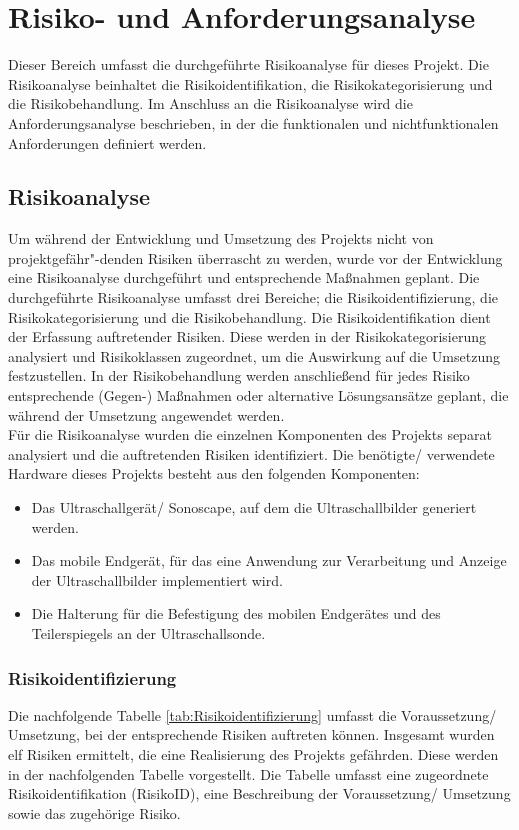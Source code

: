 \chapter{Risiko- und Anforderungsanalyse}
Dieser Bereich umfasst die durchgeführte Risikoanalyse für dieses Projekt. Die Risikoanalyse beinhaltet die Risikoidentifikation, die Risikokategorisierung und die Risikobehandlung. Im Anschluss an die Risikoanalyse wird die Anforderungsanalyse beschrieben, in der die funktionalen und nichtfunktionalen Anforderungen definiert werden. 
\section{Risikoanalyse} \label{RisikoAnalyse}
Um während der Entwicklung und Umsetzung des Projekts nicht von projektgefähr"-denden Risiken überrascht zu werden, wurde vor der Entwicklung eine Risikoanalyse durchgeführt und entsprechende Maßnahmen geplant. Die durchgeführte Risikoanalyse umfasst drei Bereiche; die Risikoidentifizierung, die Risikokategorisierung und die Risikobehandlung. Die Risikoidentifikation dient der Erfassung auftretender Risiken. Diese werden in der Risikokategorisierung analysiert und Risikoklassen zugeordnet, um die Auswirkung auf die Umsetzung festzustellen. In der Risikobehandlung werden anschließend für jedes Risiko entsprechende (Gegen-) Maßnahmen oder alternative Lösungsansätze geplant, die während der Umsetzung angewendet werden.\\
Für die Risikoanalyse wurden die einzelnen Komponenten des Projekts separat analysiert und die auftretenden Risiken identifiziert. Die benötigte/ verwendete Hardware dieses Projekts besteht aus den folgenden Komponenten:
\begin{itemize}
\item Das Ultraschallgerät/ Sonoscape, auf dem die Ultraschallbilder generiert werden.
\item Das mobile Endgerät, für das eine Anwendung zur Verarbeitung und Anzeige der Ultraschallbilder implementiert wird.
\item Die Halterung für die Befestigung des mobilen Endgerätes und des Teilerspiegels an der Ultraschallsonde.
\end{itemize}

\subsection{Risikoidentifizierung}
Die nachfolgende Tabelle \ref{tab:Risikoidentifizierung} umfasst die Voraussetzung/ Umsetzung, bei der entsprechende Risiken auftreten können. Insgesamt wurden elf Risiken ermittelt, die eine Realisierung des Projekts gefährden. Diese werden in der nachfolgenden Tabelle vorgestellt. Die Tabelle umfasst eine zugeordnete Risikoidentifikation (RisikoID), eine Beschreibung der Voraussetzung/ Umsetzung sowie das zugehörige Risiko. 

